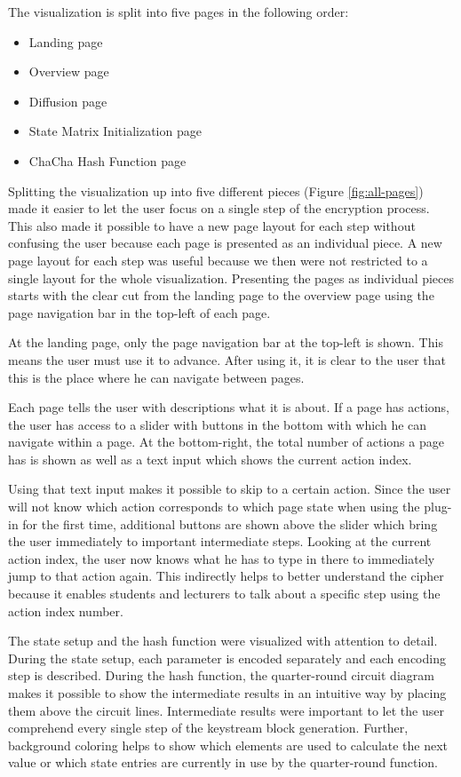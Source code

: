 \begin{enumerate}[label=(\labelenum{G}{{\arabic*}}), wide, labelwidth=!, labelindent=0pt]
     The visualization is split into five pages in the following order:
     \begin{itemize}
     \item Landing page
     \item Overview page
     \item Diffusion page
     \item State Matrix Initialization page
     \item ChaCha Hash Function page
     \end{itemize}
     Splitting the visualization up into five different pieces (Figure \autoref{fig:all-pages}) made it easier to let the user focus on a single step of the encryption process. This also made it possible to have a new page layout for each step without confusing the user because each page is presented as an individual piece. A new page layout for each step was useful because we then were not restricted to a single layout for the whole visualization. Presenting the pages as individual pieces starts with the clear cut from the landing page to the overview page using the page navigation bar in the top-left of each page. 
     
     At the landing page, only the page navigation bar at the top-left is shown. This means the user must use it to advance. After using it, it is clear to the user that this is the place where he can navigate between pages.
     
     Each page tells the user with descriptions what it is about. If a page has actions, the user has access to a slider with buttons in the bottom with which he can navigate within a page. At the bottom-right, the total number of actions a page has is shown as well as a text input which shows the current action index.
     
     Using that text input makes it possible to skip to a certain action. Since the user will not know which action corresponds to which page state when using the plug-in for the first time, additional buttons are shown above the slider which bring the user immediately to important intermediate steps. Looking at the current action index, the user now knows what he has to type in there to immediately jump to that action again. This indirectly helps to better understand the cipher because it enables students and lecturers to talk about a specific step using the action index number.
     
     The state setup and the hash function were visualized with attention to detail. \\
     During the state setup, each parameter is encoded separately and each encoding step is described. During the hash function, the quarter-round circuit diagram makes it possible to show the intermediate results in an intuitive way by placing them above the circuit lines. Intermediate results were important to let the user comprehend every single step of the keystream block generation. Further, background coloring helps to show which elements are used to calculate the next value or which state entries are currently in use by the quarter-round function.
     

\end{enumerate}
